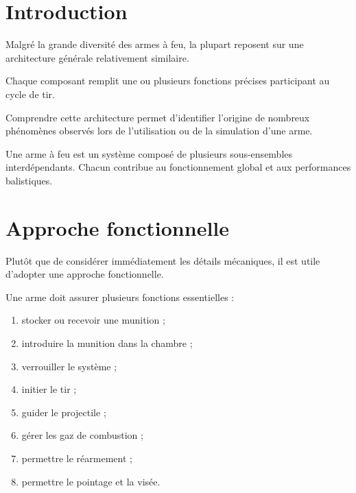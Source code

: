
\section{Introduction}

Malgré la grande diversité des armes à feu, la plupart reposent sur une
architecture générale relativement similaire.

Chaque composant remplit une ou plusieurs fonctions précises participant au
cycle de tir.

Comprendre cette architecture permet d'identifier l'origine de nombreux
phénomènes observés lors de l'utilisation ou de la simulation d'une arme.

\begin{aretenir}

Une arme à feu est un système composé de plusieurs sous-ensembles
interdépendants. Chacun contribue au fonctionnement global et aux
performances balistiques.

\end{aretenir}

\section{Approche fonctionnelle}

Plutôt que de considérer immédiatement les détails mécaniques, il est utile
d'adopter une approche fonctionnelle.

Une arme doit assurer plusieurs fonctions essentielles :

\begin{enumerate}
    \item stocker ou recevoir une munition ;
    \item introduire la munition dans la chambre ;
    \item verrouiller le système ;
    \item initier le tir ;
    \item guider le projectile ;
    \item gérer les gaz de combustion ;
    \item permettre le réarmement ;
    \item permettre le pointage et la visée.
\end{enumerate}

